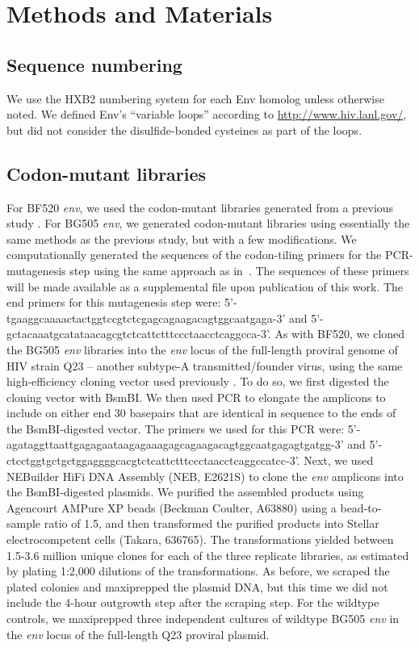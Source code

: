 \documentclass[9pt]{elife}
\begin{document}
\section{Methods and Materials}

\subsection{Sequence numbering}
We use the HXB2 numbering system \cite{korber1998numbering} for each Env homolog unless otherwise noted.
We defined Env's ``variable loops'' according to \url{http://www.hiv.lanl.gov/}, but did not consider the disulfide-bonded cysteines as part of the loops.

\subsection{Codon-mutant libraries}
For BF520 \textit{env}, we used the codon-mutant libraries generated from a previous study \cite{dingens2017comprehensive}.
For BG505 \textit{env}, we generated codon-mutant libraries using essentially the same methods as the previous study, but with a few modifications.
We computationally generated the sequences of the codon-tiling primers for the PCR-mutagenesis step using the same approach as in~\cite{dingens2017comprehensive}.
The sequences of these primers will be made available as a supplemental file upon publication of this work.
The end primers for this mutagenesis step were: 5'-tgaaggcaaaactactggtccgtctcgagcagaagacagtggcaatgaga-3' and 5'-gctacaaatgcatataacagcgtctcattctttccctaacctcaggcca-3'.
As with BF520, we cloned the BG505 \textit{env} libraries into the \textit{env} locus of the full-length proviral genome of HIV strain Q23 \cite{poss1999variants} -- another subtype-A transmitted/founder virus, using the same high-efficiency cloning vector used previously \cite{dingens2017comprehensive}.
To do so, we first digested the cloning vector with BsmBI.
We then used PCR to elongate the amplicons to include on either end 30 basepairs that are identical in sequence to the ends of the BsmBI-digested vector.
The primers we used for this PCR were:
5'-agataggttaattgagagaataagagaaagagcagaagacagtggcaatgagagtgatgg-3' and 5'-ctcctggtgctgctggaggggcacgtctcattctttccctaacctcaggccatcc-3'.
Next, we used NEBuilder HiFi DNA Assembly (NEB, E2621S) to clone the \textit{env} amplicons into the BsmBI-digested plasmids.
We purified the assembled products using Agencourt AMPure XP beads (Beckman Coulter, A63880) using a bead-to-sample ratio of 1.5, and then transformed the purified products into Stellar electrocompetent cells (Takara, 636765).
The transformations yielded between 1.5-3.6 million unique clones for each of the three replicate libraries, as estimated by plating 1:2,000 dilutions of the transformations.
As before, we scraped the plated colonies and maxiprepped the plasmid DNA, but this time we did not include the 4-hour outgrowth step after the scraping step.
For the wildtype controls, we maxiprepped three independent cultures of wildtype BG505 \textit{env} in the \textit{env} locus of the full-length Q23 proviral plasmid.
\end{document}
